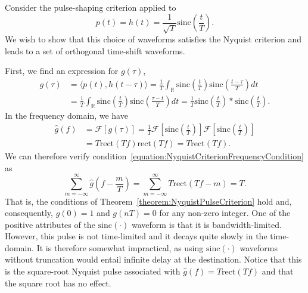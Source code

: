 \begin{example}
Consider the pulse-shaping criterion applied to
\begin{equation*}
p(t) = h (t) = \frac{1}{\sqrt{T}} \mathrm{sinc} \left( \frac{t}{T} \right) .
\end{equation*}
We wish to show that this choice of waveforms satisfies the Nyquist criterion and leads to a set of orthogonal time-shift waveforms.

First, we find an expression for $g(\tau)$,
\begin{equation*}
\begin{split}
g(\tau) &= \langle p(t), h (t-\tau) \rangle
= \frac{1}{T} \int_{\mathbb{R}} \mathrm{sinc} \left( \frac{t}{T} \right)
\mathrm{sinc} \left( \frac{t - \tau}{T} \right) dt \\
&= \frac{1}{T} \int_{\mathbb{R}} \mathrm{sinc} \left( \frac{t}{T} \right)
\mathrm{sinc} \left( \frac{\tau - t}{T} \right) dt
= \frac{1}{T} \mathrm{sinc} \left( \frac{t}{T} \right)
\ast \mathrm{sinc} \left( \frac{t}{T} \right) .
\end{split}
\end{equation*}
In the frequency domain, we have
\begin{equation*}
\begin{split}
\hat{g}(f) &= \mathcal{F} \left[ g(\tau) \right]
= \frac{1}{T} \mathcal{F} \left[ \mathrm{sinc} \left( \frac{t}{T} \right) \right]
\mathcal{F} \left[ \mathrm{sinc} \left( \frac{t}{T} \right) \right] \\
&= T \mathrm{rect} (T f) \mathrm{rect} (T f)
= T \mathrm{rect} (T f) .
\end{split}
\end{equation*}
We can therefore verify condition~\eqref{equation:NyquistCriterionFrequencyCondition} as
\begin{equation*}
\sum_{m = -\infty}^{\infty}
\hat{g} \left( f - \frac{m}{T} \right)
= \sum_{m = - \infty}^{\infty} T \mathrm{rect} (Tf - m)
= T .
\end{equation*}
That is, the conditions of Theorem~\ref{theorem:NyquistPulseCriterion} hold and, consequently, $g(0) = 1$ and $g(nT) = 0$ for any non-zero integer.
One of the positive attributes of the $\mathrm{sinc} (\cdot)$ waveform is that it is bandwidth-limited.
However, this pulse is not time-limited and it decays quite slowly in the time-domain.
It is therefore somewhat impractical, as using $\mathrm{sinc} (\cdot)$ waveforms without truncation would entail infinite delay at the destination.
Notice that this is the square-root Nyquist pulse associated with $\hat{g}(f)=T \mathrm{rect}(Tf)$ and that the square root has no effect.
\end{example}

